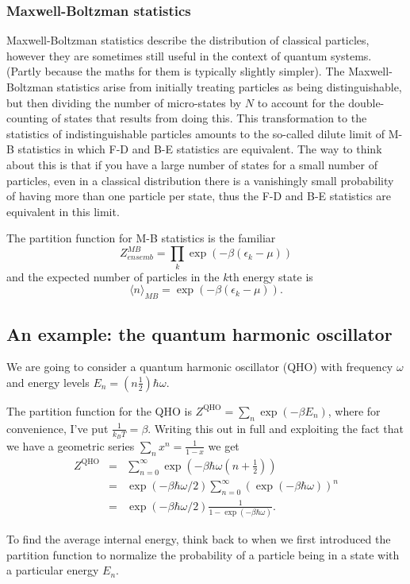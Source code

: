 \subsubsection{Maxwell-Boltzman statistics}
Maxwell-Boltzman statistics describe the distribution of classical particles, however they are sometimes still useful in the context of quantum systems. (Partly because the maths for them is typically slightly simpler). The Maxwell-Boltzman statistics arise from initially treating particles as being distinguishable, but then dividing the number of micro-states by $N\!$ to account for the double-counting of states that results from doing this. This transformation to the statistics of indistinguishable particles amounts to the so-called dilute limit of M-B statistics in which F-D and B-E statistics are equivalent. The way to think about this is that if you have a large number of states for a small number of particles, even in a classical distribution there is a vanishingly small probability of having more than one particle per state, thus the F-D and B-E statistics are equivalent in this limit.

The partition function for M-B statistics is the familiar
$$
	Z^{MB}_{ensemb} = \prod_k \exp(-\beta(\epsilon_k-\mu))
$$
and the expected number of particles in the $k$th energy state is
$$
\langle n\rangle_{MB} = \exp(-\beta(\epsilon_k-\mu)).
$$

\subsection{An example: the quantum harmonic oscillator}
We are going to consider a quantum harmonic oscillator (QHO) with frequency $\omega$ and energy levels $E_n = (n\frac12)\hbar\omega$.

The partition function for the QHO is $Z^\text{QHO} = \sum_n\exp(-\beta E_n)$, where for convenience, I've put $\frac{1}{k_BT} = \beta$. Writing this out in full and exploiting the fact that we have a geometric series $\sum_n x^n = \frac{1}{1-x}$ we get
\begin{eqnarray*}
	Z^\text{QHO} &=& \sum_{n=0}^\infty \exp(-\beta\hbar\omega(n+\frac12))\\
	&=& \exp(-\beta\hbar\omega/2)\sum_{n=0}^\infty(\exp(-\beta\hbar\omega))^n \\
	&=& \exp(-\beta\hbar\omega/2)\frac{1}{1-\exp(-\beta\hbar\omega)}.
\end{eqnarray*}

To find the average internal energy, think back to when we first introduced the partition function to normalize the probability of a particle being in a state with a particular energy $E_n$.

